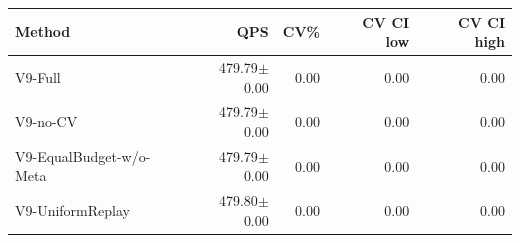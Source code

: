 \begin{tabular}{lrrrr}
\hline
Method & QPS & CV\% & CV CI low & CV CI high \\
\hline
V9-Full & 479.79$\pm$0.00 & 0.00 & 0.00 & 0.00 \\
V9-no-CV & 479.79$\pm$0.00 & 0.00 & 0.00 & 0.00 \\
V9-EqualBudget-w/o-Meta & 479.79$\pm$0.00 & 0.00 & 0.00 & 0.00 \\
V9-UniformReplay & 479.80$\pm$0.00 & 0.00 & 0.00 & 0.00 \\
\hline
\end{tabular}